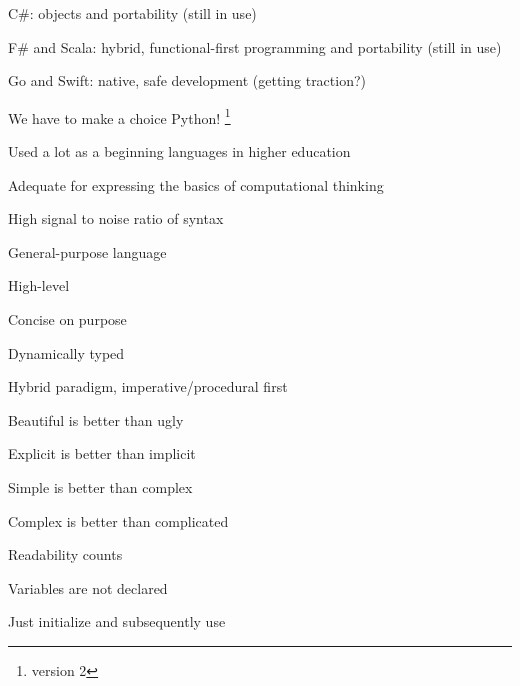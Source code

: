 \documentclass{beamer}
\begin{document}
\begin{slide}{
\item C\#: objects and portability (still in use)
\item F\# and Scala: hybrid, functional-first programming and portability (still in use)
\item Go and Swift: native, safe development (getting traction?)
}\end{slide}


\begin{frame}{We have to make a choice}
\center
\fontsize{18pt}{7.2}\selectfont
Python! \footnote{version 2}
\end{frame}

\begin{slide}{
\item Used a lot as a beginning languages in higher education
\item Adequate for expressing the basics of computational thinking
\item High signal to noise ratio of syntax
}\end{slide}

\begin{slide}{
\item General-purpose language
\item High-level
\item Concise on purpose
\item Dynamically typed
\item Hybrid paradigm, imperative/procedural first
}\end{slide}

\begin{slide}{
\item Beautiful is better than ugly
\item Explicit is better than implicit
\item Simple is better than complex
\item Complex is better than complicated
\item Readability counts
}\end{slide}

\begin{slide}{
\item Variables are not declared
\item Just initialize and subsequently use
}\end{slide}
\end{document}
